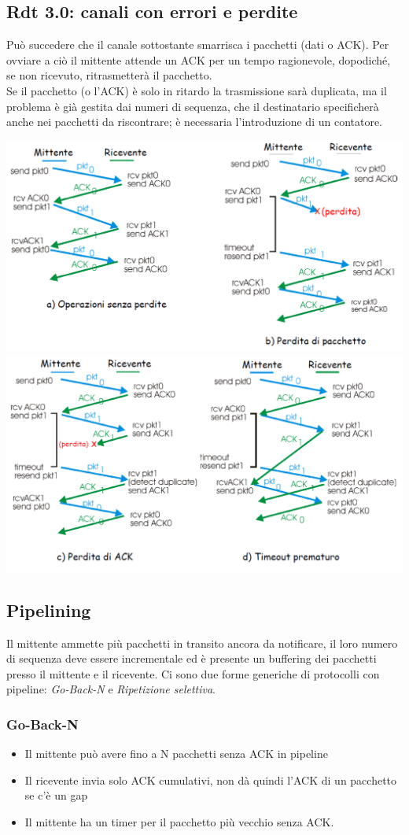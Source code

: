 \documentclass{report}
\begin{document}
	 \subsection{Rdt 3.0: canali con errori e perdite}
	 Può succedere che il canale sottostante smarrisca i pacchetti (dati o ACK). Per ovviare a ciò il mittente attende un ACK per un tempo ragionevole, dopodiché, se non ricevuto, ritrasmetterà il pacchetto.
	 \medskip\\Se il pacchetto (o l'ACK) è solo in ritardo la trasmissione sarà duplicata, ma il problema è già gestita dai numeri di sequenza, che il destinatario specificherà anche nei pacchetti da riscontrare; è necessaria l'introduzione di un contatore.
	\begin{center}
		\includegraphics[width=0.7\linewidth]{rdt-2}
		\includegraphics[width=0.7\linewidth]{rdt-3}
	\end{center}
	\subsection{Pipelining} Il mittente ammette più pacchetti in transito ancora da notificare, il loro numero di sequenza deve essere incrementale ed è presente un buffering dei pacchetti presso il mittente e il ricevente. Ci sono due forme generiche di protocolli con pipeline: \textit{Go-Back-N} e \textit{Ripetizione selettiva}.
	\subsubsection{Go-Back-N}
	\begin{itemize}
		\item Il mittente può avere fino a N pacchetti senza ACK in pipeline
		\item Il ricevente invia solo ACK cumulativi, non dà quindi l'ACK di un pacchetto se c'è un gap
		\item Il mittente ha un timer per il pacchetto più vecchio senza ACK.
	\end{itemize}
\end{document}
